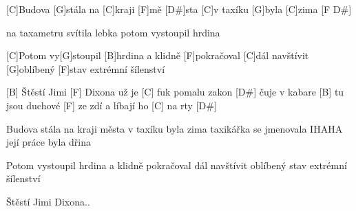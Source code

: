 
[C]Budova [G]stála na [C]kraji [F]mě [D#]sta
[C]v taxíku [G]byla [C]zima [F D#]

na taxametru svítila lebka
potom vystoupil hrdina

[C]Potom vy[G]stoupil [B]hrdina
a klidně [F]pokračoval [C]dál
navštívit [G]oblíbený [F]stav
extrémní šílenství

[B] Štěstí Jimi [F] Dixona už je [C] fuk
pomalu zakon [D#] čuje v kabare [B] tu
jsou duchové [F] ze zdí
a líbají ho [C] na rty [D#]

Budova stála na kraji města
v taxíku byla zima
taxikářka se jmenovala IHAHA
její práce byla dřina

Potom vystoupil hrdina
a klidně pokračoval dál
navštívit oblíbený stav
extrémní šílenství

Štěstí Jimi Dixona..